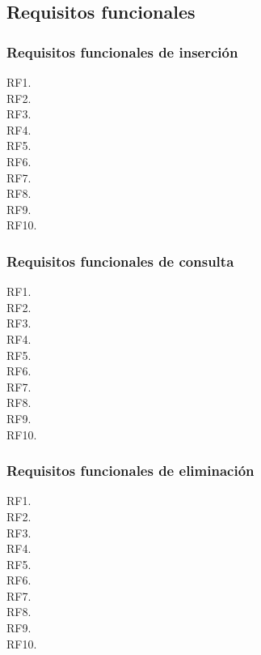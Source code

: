 \subsection*{Requisitos funcionales}
\subsubsection{Requisitos funcionales de inserción}
\begin{description}
    \item[RF1.]
    \item[RF2.]
    \item[RF3.]
    \item[RF4.]
    \item[RF5.]
    \item[RF6.]
    \item[RF7.]
    \item[RF8.]
    \item[RF9.]
    \item[RF10.]
\end{description}

\subsubsection{Requisitos funcionales de consulta}
\begin{description}
    \item[RF1.]
    \item[RF2.]
    \item[RF3.]
    \item[RF4.]
    \item[RF5.]
    \item[RF6.]
    \item[RF7.]
    \item[RF8.]
    \item[RF9.]
    \item[RF10.]
\end{description}

\subsubsection{Requisitos funcionales de eliminación}
\begin{description}
    \item[RF1.]
    \item[RF2.]
    \item[RF3.]
    \item[RF4.]
    \item[RF5.]
    \item[RF6.]
    \item[RF7.]
    \item[RF8.]
    \item[RF9.]
    \item[RF10.]
\end{description}

